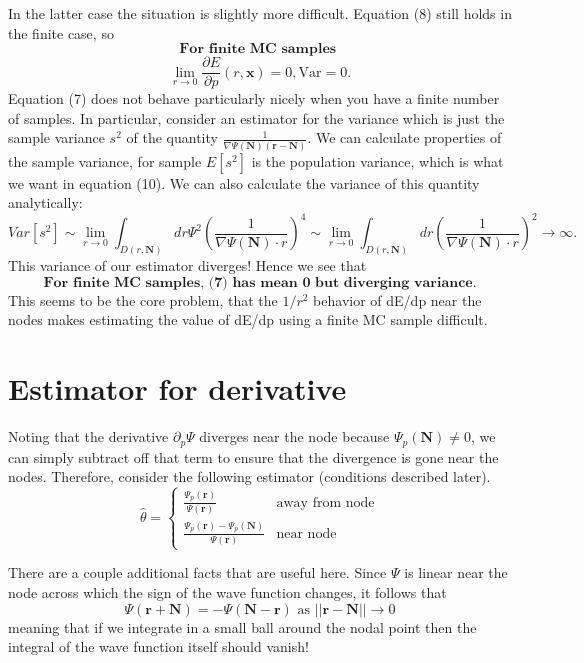 \documentclass{article}
\begin{document}
In the latter case the situation is slightly more difficult. Equation (8) still holds in the finite case, so 
$$\textbf{For\ } \textbf{finite\ } \textbf{MC } \textbf{samples }$$
\begin{equation}
\boxed{\lim_{r \rightarrow 0} \frac{\partial E}{\partial p}(r,\textbf{x}) = 0, \text{Var} = 0.}
\end{equation}
Equation (7) does not behave particularly nicely when you have a finite number of samples. In particular, consider an estimator for the variance which is just the sample variance $s^2$ of the quantity $\frac{1}{\nabla \Psi(\textbf{N})(\textbf{r}-\textbf{N})}$. We can calculate properties of the sample variance, for sample $E[s^2]$ is the population variance, which is what we want in equation (10). We can also calculate the variance of this quantity analytically:
\begin{equation}
\boxed{Var[s^2] \sim \lim_{r\rightarrow 0} \int_{D(r,\textbf{N})} dr \Psi^2 (\frac{1}{\nabla\Psi(\textbf{N})\cdot r})^4 \sim \lim_{r\rightarrow 0} \int_{D(r,\textbf{N})} dr (\frac{1}{\nabla\Psi(\textbf{N})\cdot r})^2 \rightarrow \infty.}
\end{equation}
This variance of our estimator diverges!
Hence we see that 
$$\textbf{For finite MC samples, (7) has mean 0 but diverging variance.}$$
This seems to be the core problem, that the $1/r^2$ behavior of dE/dp near the nodes makes estimating the value of dE/dp using a finite MC sample difficult.

\section{Estimator for derivative}
Noting that the derivative $\partial_p \Psi$ diverges near the node because $\Psi_p(\textbf{N}) \neq 0$, we can simply subtract off that term to ensure that the divergence is gone near the nodes. Therefore, consider the following estimator (conditions described later).
\begin{equation} 
\boxed{\hat{\theta}=\begin{cases}
\frac{\Psi_p(\textbf{r})}{\Psi(\textbf{r})} & \text{away from node} \\
 \frac{\Psi_p(\textbf{r})-\Psi_p(\textbf{N})}{\Psi(\textbf{r})} & \text{near node}      
\end{cases}}
\end{equation}

There are a couple additional facts that are useful here. Since $\Psi$ is linear near the node across which the sign of the wave function changes, it follows that 
\begin{equation}
\Psi(\textbf{r}+\textbf{N}) = -\Psi(\textbf{N}-\textbf{r}) \text{ as } ||\textbf{r} - \textbf{N}|| \rightarrow 0
\end{equation}
meaning that if we integrate in a small ball around the nodal point then the integral of the wave function itself should vanish!
\end{document}

